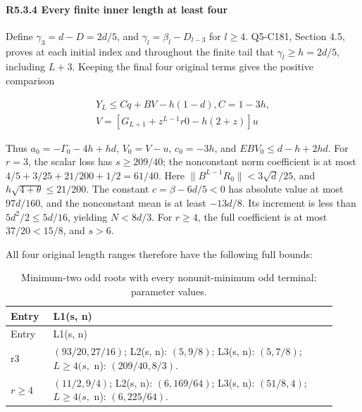 \paragraph{R5.3.4 Every finite inner length at least four}

Define \(\gamma_3=d-D=2d/5\), and \(\gamma_l=\beta_l-D_{l-3}\) for \(l\ge4\). Q5-C181, Section 4.5, proves at each initial index and throughout the finite tail that \(\gamma_l\ge h=2d/5\), including \(L+3\). Keeping the final four original terms gives the positive comparison

\[
\begin{gathered}
Y_L\le Cq+BV-h(1-d),C=1-3h,\\
V=[G_{L+1}+z^{L-1}r0-h(2+z)]u
\end{gathered}
\]

Thus \(a_0=-\Gamma_0-4h+hd\), \(V_0=V-u\), \(c_0=-3h\), and \(EBV_0\le d-h+2hd\). For \(r=3\), the scalar loss has \(s\ge209/40\); the nonconstant norm coefficient is at most \(4/5+3/25+21/200+1/2=61/40\). Here \(\|B^{L-1}R_0\|<3\sqrt d/25\), and \(h\sqrt{4+\theta}\le21/200\). The constant \(c=\beta-6d/5<0\) has absolute value at most \(97d/160\), and the nonconstant mean is at least \(-13d/8\). Its increment is less than \(5d^2/2\le5d/16\), yielding \(N<8d/3\). For \(r\ge4\), the full coefficient is at most \(37/20<15/8\), and \(s>6\).

All four original length ranges therefore have the following full bounds:


\begingroup\small
\setlength{\tabcolsep}{3pt}
\setlength{\LTleft}{0pt}\setlength{\LTright}{\fill}
\begin{longtable}{@{}p{0.1200\linewidth}p{0.8000\linewidth}@{}}
\caption{Minimum-two odd roots with every nonunit-minimum odd terminal: parameter values.}\label{tab:parameters:r2-c005:3}\\
\toprule
Entry & L1(s, n) \\
\midrule\endfirsthead
\toprule
Entry & L1(s, n) \\
\midrule\endhead
\bottomrule\endfoot
r3 & \((93/20,\allowbreak 27/16)\); L2(s, n): \((5,\allowbreak 9/8)\); L3(s, n): \((5,\allowbreak 7/8)\); \(L\ge 4(s,\allowbreak \) n): \((209/40,\allowbreak 8/3)\). \\
\addlinespace[2pt]
\(r\ge 4\) & \((11/2,\allowbreak 9/4)\); L2(s, n): \((6,\allowbreak 169/64)\); L3(s, n): \((51/8,\allowbreak 4)\); \(L\ge 4(s,\allowbreak \) n): \((6,\allowbreak 225/64)\). \\
\end{longtable}
\endgroup


